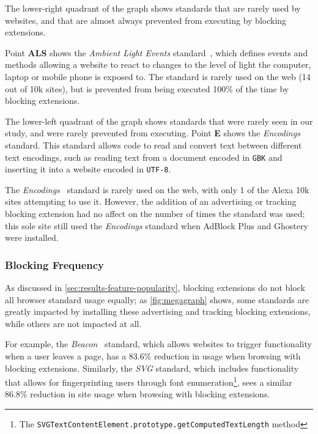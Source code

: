 The lower-right quadrant of the graph shows standards that are rarely used by
websites, and that are almost always prevented from executing by blocking
extensions.

Point \textbf{ALS} shows the \textit{Ambient Light Events}
standard~\cite{ambientlightapi}, which defines events and methods allowing a
website to react to changes to the level of light the computer, laptop or
mobile phone is exposed to.  The standard is rarely used on the web (14 out of
10k sites), but is prevented from being executed 100\% of the time by blocking
extensions.

The lower-left quadrant of the graph shows standards that were rarely seen in
our study, and were rarely prevented from executing.  Point \textbf{E} shows
the \textit{Encodings}~\cite{encodingw3c} standard.  This standard allows \JS
code to read and convert text between different text encodings, such as reading
text from a document encoded in \texttt{GBK} and inserting it into a website
encoded in \texttt{UTF-8}.

The \textit{Encodings}~\cite{encodingw3c} standard is rarely used on the web,
with only 1 of the Alexa 10k sites attempting to use it.  However, the addition
of an advertising or tracking blocking extension had no affect on the number of
times the standard was used; this sole site still used the \textit{Encodings}
standard when AdBlock Plus and Ghostery were installed.


\subsubsection{Blocking Frequency}
As discussed in \ref{sec:results-feature-popularity}, blocking extensions do
not block all browser standard usage equally; as \ref{fig:megagraph}
shows, some standards are greatly impacted by installing these advertising and
tracking blocking extensions, while others are not impacted at all.

For example, the \textit{Beacon}~\cite{beaconapi} standard, which allows
websites to trigger functionality when a user leaves a page, has a 83.6\%
reduction in usage when browsing with blocking extensions.  Similarly, the
\textit{SVG} standard, which includes functionality that allows for
fingerprinting users through font enumeration\footnote{The
\texttt{SVGTextContentElement.prototype.getComputedTextLength} method}, sees a
similar 86.8\% reduction in site usage when browsing with blocking extensions.

